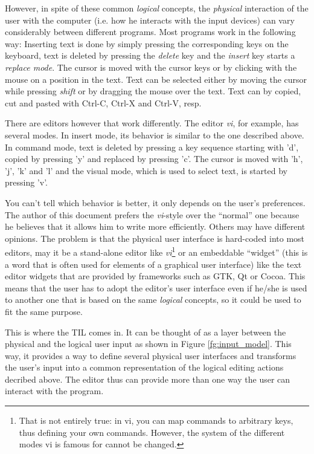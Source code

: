 \documentclass[a4paper]{article}
\begin{document}
However, in spite of these common \emph{logical} concepts, the \emph{physical} interaction of the user with the computer (i.e. how he interacts with the input devices) can vary considerably between different programs. Most programs work in the following way: Inserting text is done by simply pressing the corresponding keys on the keyboard, text is deleted by pressing the \emph{delete} key and the \emph{insert} key starts a \emph{replace mode}. The cursor is moved with the cursor keys or by clicking with the mouse on a position in the text. Text can be selected either by moving the cursor while pressing \emph{shift} or by dragging the mouse over the text. Text can by copied, cut and pasted with Ctrl-C, Ctrl-X and Ctrl-V, resp.

There are editors however that work differently. The editor \emph{vi}, for example, has several modes. In insert mode, its behavior is similar to the one described above. In command mode, text is deleted by pressing a key sequence starting with 'd', copied by pressing 'y' and replaced by pressing 'c'. The cursor is moved with 'h', 'j', 'k' and 'l' and the visual mode, which is used to select text, is started by pressing 'v'.

You can't tell which behavior is better, it only depends on the user's preferences. The author of this document prefers the \emph{vi}-style over the ``normal'' one because he believes that it allows him to write more efficiently. Others may have different opinions. The problem is that the physical user interface is hard-coded into most editors, may it be a stand-alone editor like \emph{vi}\footnote{That is not entirely true: in vi, you can map commands to arbitrary keys, thus defining your own commands. However, the system of the different modes vi is famous for cannot be changed.} or an embeddable ``widget'' (this is a word that is often used for elements of a graphical user interface) like the text editor widgets that are provided by frameworks such as GTK, Qt or Cocoa. This means that the user has to adopt the editor's user interface even if he/she is used to another one that is based on the same \emph{logical} concepts, so it could be used to fit the same purpose.

This is where the TIL comes in. It can be thought of as a layer between the physical and the logical user input as shown in Figure \ref{fg:input_model}. This way, it provides a way to define several physical user interfaces and transforms the user's input into a common representation of the logical editing actions decribed above. The editor thus can provide more than one way the user can interact with the program. 
\end{document}
